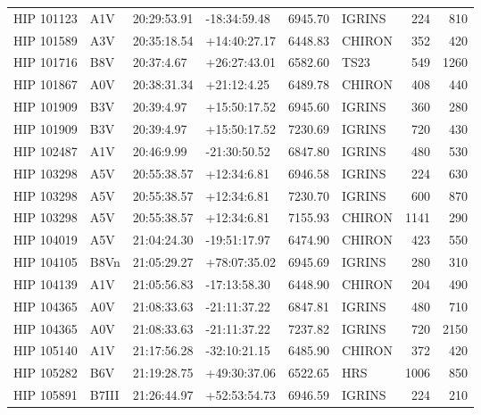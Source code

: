 \documentclass{emulateapj}
\begin{document}
\begin{longtable*}{|l|lllrlrr|}
  HIP 101123 &            A1V &    20:29:53.91 &   -18:34:59.48 &  6945.70 &     IGRINS &      224 &     810 \\
  HIP 101589 &            A3V &    20:35:18.54 &   +14:40:27.17 &  6448.83 &     CHIRON &      352 &     420 \\
  HIP 101716 &            B8V &     20:37:4.67 &   +26:27:43.01 &  6582.60 &       TS23 &      549 &    1260 \\
  HIP 101867 &            A0V &    20:38:31.34 &    +21:12:4.25 &  6489.78 &     CHIRON &      408 &     440 \\
  HIP 101909 &            B3V &     20:39:4.97 &   +15:50:17.52 &  6945.60 &     IGRINS &      360 &     280 \\
  HIP 101909 &            B3V &     20:39:4.97 &   +15:50:17.52 &  7230.69 &     IGRINS &      720 &     430 \\
  HIP 102487 &            A1V &     20:46:9.99 &   -21:30:50.52 &  6847.80 &     IGRINS &      480 &     530 \\
  HIP 103298 &            A5V &    20:55:38.57 &    +12:34:6.81 &  6946.58 &     IGRINS &      224 &     630 \\
  HIP 103298 &            A5V &    20:55:38.57 &    +12:34:6.81 &  7230.70 &     IGRINS &      600 &     870 \\
  HIP 103298 &            A5V &    20:55:38.57 &    +12:34:6.81 &  7155.93 &     CHIRON &     1141 &     290 \\
  HIP 104019 &            A5V &    21:04:24.30 &   -19:51:17.97 &  6474.90 &     CHIRON &      423 &     550 \\
  HIP 104105 &           B8Vn &    21:05:29.27 &   +78:07:35.02 &  6945.69 &     IGRINS &      280 &     310 \\
  HIP 104139 &            A1V &    21:05:56.83 &   -17:13:58.30 &  6448.90 &     CHIRON &      204 &     490 \\
  HIP 104365 &            A0V &    21:08:33.63 &   -21:11:37.22 &  6847.81 &     IGRINS &      480 &     710 \\
  HIP 104365 &            A0V &    21:08:33.63 &   -21:11:37.22 &  7237.82 &     IGRINS &      720 &    2150 \\
  HIP 105140 &            A1V &    21:17:56.28 &   -32:10:21.15 &  6485.90 &     CHIRON &      372 &     420 \\
  HIP 105282 &            B6V &    21:19:28.75 &   +49:30:37.06 &  6522.65 &        HRS &     1006 &     850 \\
  HIP 105891 &          B7III &    21:26:44.97 &   +52:53:54.73 &  6946.59 &     IGRINS &      224 &     210 \\

\end{longtable*}
\end{document}
